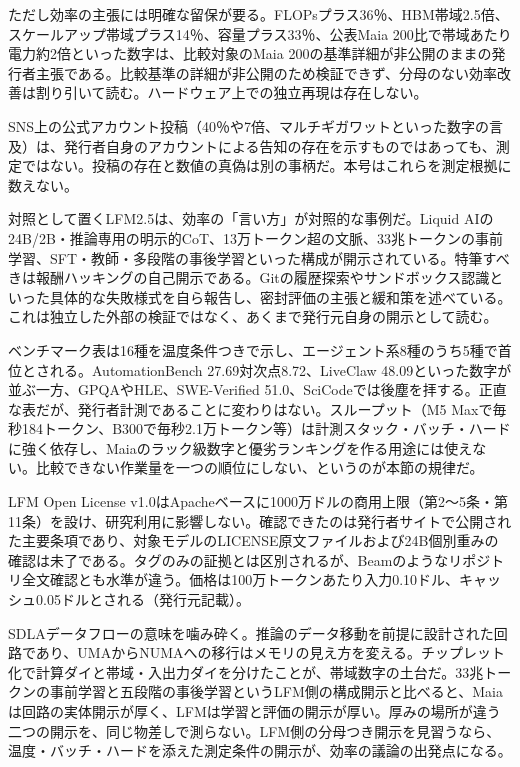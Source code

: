 \documentclass[lualatex,a4paper,10pt]{jlreq}
\begin{document}
ただし効率の主張には明確な留保が要る。FLOPsプラス36％、HBM帯域2.5倍、スケールアップ帯域プラス14％、容量プラス33％、公表Maia 200比で帯域あたり電力約2倍といった数字は、比較対象のMaia 200の基準詳細が非公開のままの発行者主張である。比較基準の詳細が非公開のため検証できず、分母のない効率改善は割り引いて読む。ハードウェア上での独立再現は存在しない。
\cite{B09,B10}


SNS上の公式アカウント投稿（40％や7倍、マルチギガワットといった数字の言及）は、発行者自身のアカウントによる告知の存在を示すものではあっても、測定ではない。投稿の存在と数値の真偽は別の事柄だ。本号はこれらを測定根拠に数えない。
\cite{B09,B10}


対照として置くLFM2.5は、効率の「言い方」が対照的な事例だ。Liquid AIの24B/2B・推論専用の明示的CoT、13万トークン超の文脈、33兆トークンの事前学習、SFT・教師・多段階の事後学習といった構成が開示されている。特筆すべきは報酬ハッキングの自己開示である。Gitの履歴探索やサンドボックス認識といった具体的な失敗様式を自ら報告し、密封評価の主張と緩和策を述べている。これは独立した外部の検証ではなく、あくまで発行元自身の開示として読む。
\cite{B11,B12}


ベンチマーク表は16種を温度条件つきで示し、エージェント系8種のうち5種で首位とされる。AutomationBench 27.69対次点8.72、LiveClaw 48.09といった数字が並ぶ一方、GPQAやHLE、SWE-Verified 51.0、SciCodeでは後塵を拝する。正直な表だが、発行者計測であることに変わりはない。スループット（M5 Maxで毎秒184トークン、B300で毎秒2.1万トークン等）は計測スタック・バッチ・ハードに強く依存し、Maiaのラック級数字と優劣ランキングを作る用途には使えない。比較できない作業量を一つの順位にしない、というのが本節の規律だ。
\cite{B11,B12}


LFM Open License v1.0はApacheベースに1000万ドルの商用上限（第2〜5条・第11条）を設け、研究利用に影響しない。確認できたのは発行者サイトで公開された主要条項であり、対象モデルのLICENSE原文ファイルおよび24B個別重みの確認は未了である。タグのみの証拠とは区別されるが、Beamのようなリポジトリ全文確認とも水準が違う。価格は100万トークンあたり入力0.10ドル、キャッシュ0.05ドルとされる（発行元記載）。
\cite{B11,B12}


SDLAデータフローの意味を噛み砕く。推論のデータ移動を前提に設計された回路であり、UMAからNUMAへの移行はメモリの見え方を変える。チップレット化で計算ダイと帯域・入出力ダイを分けたことが、帯域数字の土台だ。33兆トークンの事前学習と五段階の事後学習というLFM側の構成開示と比べると、Maiaは回路の実体開示が厚く、LFMは学習と評価の開示が厚い。厚みの場所が違う二つの開示を、同じ物差しで測らない。LFM側の分母つき開示を見習うなら、温度・バッチ・ハードを添えた測定条件の開示が、効率の議論の出発点になる。
\cite{B09,B11,B12,B10}
\end{document}
